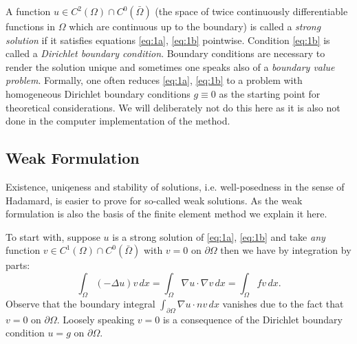 \documentclass[a4paper,
		     11pt,
		     DIV12,
		     DIVcalc,
		     headings=normal,
		     oneside,
		     bibliography=totoc,
		     headsepline=false,
		     headinclude]{scrartcl}
\begin{document}
A function $u\in C^2(\Omega)\cap C^0(\bar\Omega)$ 
(the space of twice continuously differentiable functions in $\Omega$ which are continuous
up to the boundary)
is called a {\em strong solution}
if it satisfies equations \eqref{eq:1a}, \eqref{eq:1b} pointwise. 
Condition \eqref{eq:1b} is called a {\em Dirichlet boundary condition}. Boundary conditions
are necessary to render the solution unique and sometimes one speaks also
of a {\em boundary value problem}.
Formally, one often reduces \eqref{eq:1a}, \eqref{eq:1b}
to a problem with homogeneous Dirichlet boundary conditions $g\equiv 0$ as the
starting point for theoretical considerations. We will deliberately not do this
here as it is also not done in the computer implementation of the method. 

\subsection{Weak Formulation}

Existence, uniqeness and stability of solutions, i.e. well-posedness in the
sense of Hadamard, is easier to prove for so-called weak solutions. As the weak
formulation is also the basis of the finite element method we explain it here.

To start with, suppose $u$ is a strong solution of \eqref{eq:1a}, \eqref{eq:1b} and take 
{\em any } function
$v\in C^1(\Omega)\cap C^0(\bar\Omega)$ with $v=0$ on $\partial\Omega$ then we
have by integration by parts:
\begin{equation*}
\int_\Omega (-\Delta u) v \,dx = 
\int_\Omega \nabla u \cdot \nabla v \,dx= \int_\Omega fv \,dx.
\end{equation*}
Observe that the boundary integral $\int_{\partial\Omega} \nabla u\cdot n v\,dx$ vanishes
due to the fact that $v=0$ on $\partial\Omega$. Loosely speaking $v=0$ is a consequence
of the Dirichlet boundary condition $u=g$ on $\partial\Omega$.
\end{document}
